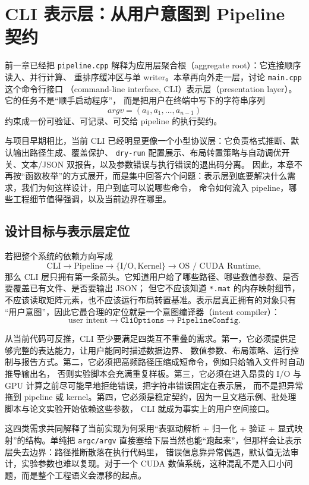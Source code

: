 \section{CLI 表示层：从用户意图到 Pipeline 契约}

前一章已经把 \texttt{pipeline.cpp} 解释为应用层聚合根（aggregate root）：它连接顺序读入、并行计算、
重排序缓冲区与单 writer。本章再向外走一层，讨论 \texttt{main.cpp} 这个命令行接口
（command-line interface, CLI）表示层（presentation layer）。它的任务不是“顺手启动程序”，
而是把用户在终端中写下的字符串序列
\[
    argv=(a_0,a_1,\ldots,a_{n-1})
\]
约束成一份可验证、可记录、可交给 pipeline 的执行契约。

与项目早期相比，当前 CLI 已经明显更像一个小型协议层：它负责格式推断、默认输出路径生成、覆盖保护、
\texttt{dry-run} 配置展示、布局转置策略与自动调优开关、文本/JSON 双报告，以及参数错误与执行错误的退出码分离。
因此，本章不再按“函数枚举”的方式展开，而是集中回答六个问题：表示层到底要解决什么需求，我们为何这样设计，用户到底可以说哪些命令，
命令如何流入 pipeline，哪些工程细节值得强调，以及当前边界在哪里。

\subsection{设计目标与表示层定位}

若把整个系统的依赖方向写成
\[
    \text{CLI}
    \longrightarrow
    \text{Pipeline}
    \longrightarrow
    \{\text{I/O},\text{Kernel}\}
    \longrightarrow
    \text{OS / CUDA Runtime},
\]
那么 CLI 层只拥有第一条箭头。它知道用户给了哪些路径、哪些数值参数、是否要覆盖已有文件、是否要输出 JSON；
但它不应该知道 \texttt{*.mat} 的内存映射细节，不应该读取矩阵元素，也不应该运行布局转置基准。表示层真正拥有的对象只有
“用户意图”，因此它最合理的定位就是一个意图编译器（intent compiler）：
\[
    \text{user intent}
    \longrightarrow
    \texttt{CliOptions}
    \longrightarrow
    \texttt{PipelineConfig}.
\]

从当前代码可反推，CLI 至少要满足四类互不重叠的需求。第一，它必须提供足够完整的表达能力，让用户能同时描述数据边界、
数值参数、布局策略、运行控制与报告方式。第二，它必须把高频路径压缩成短命令，例如只给输入文件时自动推导输出名，
否则实验脚本会充满重复样板。第三，它必须在进入昂贵的 I/O 与 GPU 计算之前尽可能早地拒绝错误，把字符串错误固定在表示层，
而不是把异常拖到 pipeline 或 kernel。第四，它必须是稳定契约，因为一旦文档示例、批处理脚本与论文实验开始依赖这些参数，
CLI 就成为事实上的用户空间接口。

这四类需求共同解释了当前实现为何采用“表驱动解析 + 归一化 + 验证 + 显式映射”的结构。单纯把
\texttt{argc/argv} 直接塞给下层当然也能“跑起来”，但那样会让表示层失去边界：路径推断散落在执行代码里，
错误信息靠异常偶遇，默认值无法审计，实验参数也难以复现。对于一个 CUDA 数值系统，这种混乱不是入口小问题，而是整个工程语义会漂移的起点。

